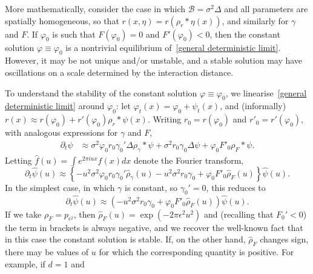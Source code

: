 \documentclass[12pt]{article}
\def \hat{\widehat}
\newcommand{\DG}{\mathcal{B}}  %
\newcommand{\kernel}{\rho}  %
\newcommand{\smooth}[1]{\kernel_{#1} \! * \!}  %
\numberwithin{equation}{section}
\begin{document}
More mathematically, consider the case in which
$\DG = \sigma^2 \Delta$ and all 
parameters are spatially homogeneous,
so that $r(x, \eta) = r(\smooth{r}\eta(x))$, and similarly for $\gamma$ and $F$.
If $\varphi_0$ is such that $F(\varphi_0)=0$ and $F'(\varphi_0)<0$, then the
constant solution $\varphi\equiv\varphi_0$ is a nontrivial equilibrium
of~\eqref{general deterministic limit}. However, it may be not unique and/or unstable,
and a stable solution may have oscillations on a scale determined by the interaction distance.

To understand the stability of the constant solution $\varphi\equiv\varphi_0$, 
we
linearise~\eqref{general deterministic limit} around $\varphi_0$:
let $\varphi_t(x) = \varphi_0 + \psi_t(x)$,
and (informally) $r(x) \approx r(\varphi_0) + r'(\varphi_0) \smooth{r} \psi(x)$.
Writing $r_0 = r(\varphi_0)$ and $r'_0 = r'(\varphi_0)$,
with analogous expressions for $\gamma$ and $F$,
\begin{align*}
    \partial_t \psi
    &\approx
    \sigma^2 \varphi_0 r_0 \gamma_0' \Delta \smooth{\gamma} \psi
    + \sigma^2 r_0 \gamma_0 \Delta \psi
    + \varphi_0 F'_0 \smooth{F} \psi .
\end{align*}
Letting $\hat f(u) = \int e^{2\pi i u x} f(x) dx$ denote the Fourier transform,
\begin{equation}
	\label{fourier transform psi}
    \partial_t \hat \psi(u)
    \approx
	\left\{
	- u^2\sigma^2 \varphi_0 r_0 \gamma_0' \hat{\rho}_\gamma(u) 
        - u^2 \sigma^2 r_0 \gamma_0
	+ \varphi_0 F'_0 \hat{\rho}_F(u) 
	\right\} \hat \psi(u) .
\end{equation}
In the simplest case, in which $\gamma$ is constant, so $\gamma_0'=0$,
this reduces to
\begin{equation} %
	\label{simplest FT}
	\partial_t \hat \psi(u)
    \approx
    \left(
        - u^2 \sigma^2 r_0 \gamma_0
	+ \varphi_0 F'_0 \hat{\rho}_F(u) 
    \right) \hat \psi(u) .
\end{equation} %
If we take $\rho_F=p_{\epsilon^2}$, then 
$\hat{\rho}_F(u)=\exp(-2\pi\epsilon^2 u^2)$ and (recalling 
that $F_0'<0$) the term in brackets is always negative, and we recover
the well-known fact that in this case the constant solution is stable.
If, on the other hand, $\hat{\rho}_F$ changes sign, there may be values of $u$ for which the corresponding quantity is positive. For example, if $d=1$ and
\end{document}
